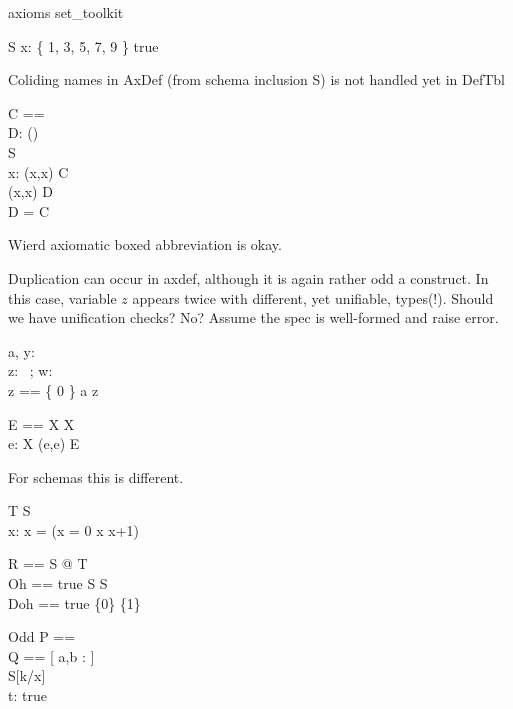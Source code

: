\documentclass{article}
\begin{document}
\begin{zsection}
\SECTION axioms \parents set\_toolkit
\end{zsection}

\begin{schema}{S}
   x: \{ 1, 3, 5, 7, 9 \}
\where
   true
\end{schema}

Coliding names in AxDef (from schema inclusion S) is not handled yet in DefTbl
\begin{axdef}
   C == \nat \cross \nat \\
   D: \power(\nat \cross \nat) \\
   S \\
   x: \nat
\where
   (x,x) \in C \\
   (x,x) \in D \\
   D = C
\end{axdef}
Wierd axiomatic boxed abbreviation is okay.

Duplication can occur in axdef, although it is again rather odd a construct.
In this case, variable $z$ appears twice with different, yet unifiable, types(!).
Should we have unification checks? No? Assume the spec is well-formed and raise error.
\begin{axdef}
   a, y: \nat \\
   z: \power~\nat; w: \nat \cross \nat \\
   z == \{ 0 \}
\where
   a \in z
\end{axdef}

\begin{gendef}[X]
   E == X \cross X \\
   e: X
\where
   (e,e) \in E
\end{gendef}

For schemas this is different.
\begin{schema}{T}
   S \\
   x: \nat
 \where
    x = (\IF x = 0 \THEN x \ELSE x+1)
\end{schema}

\begin{zed}
   R == \forall S @ T
   \\
   Oh == \IF true \THEN S \ELSE \lnot S
   \\
   Doh == \IF true \THEN \{0\} \ELSE \{1\}
\end{zed}

\begin{schema}{Odd}
   P == \nat \cross \nat \\
   Q == [ a,b : \nat ] \\
   S[k/x] \\
   t: \nat
\where 
   true
\end{schema}
\end{document}
